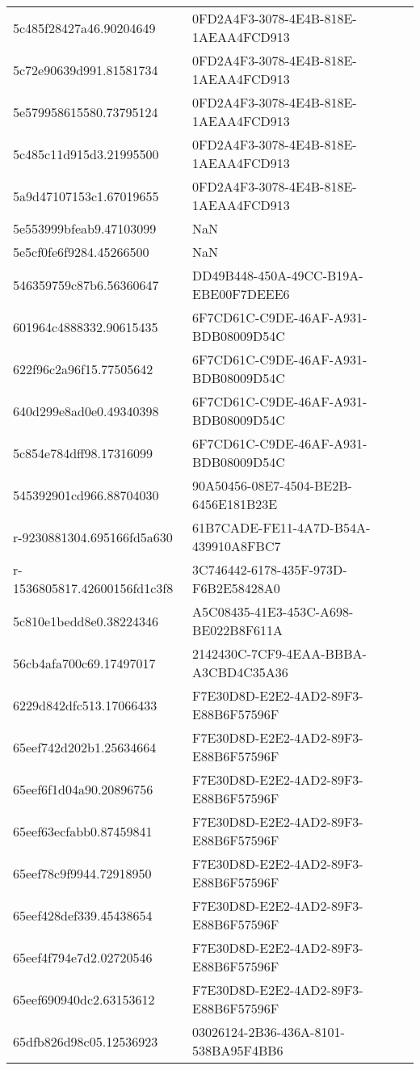 \begin{tabular}{ll}
5c485f28427a46.90204649 & 0FD2A4F3-3078-4E4B-818E-1AEAA4FCD913 \\
5c72e90639d991.81581734 & 0FD2A4F3-3078-4E4B-818E-1AEAA4FCD913 \\
5e579958615580.73795124 & 0FD2A4F3-3078-4E4B-818E-1AEAA4FCD913 \\
5c485c11d915d3.21995500 & 0FD2A4F3-3078-4E4B-818E-1AEAA4FCD913 \\
5a9d47107153c1.67019655 & 0FD2A4F3-3078-4E4B-818E-1AEAA4FCD913 \\
5e553999bfeab9.47103099 & NaN \\
5e5cf0fe6f9284.45266500 & NaN \\
546359759c87b6.56360647 & DD49B448-450A-49CC-B19A-EBE00F7DEEE6 \\
601964c4888332.90615435 & 6F7CD61C-C9DE-46AF-A931-BDB08009D54C \\
622f96c2a96f15.77505642 & 6F7CD61C-C9DE-46AF-A931-BDB08009D54C \\
640d299e8ad0e0.49340398 & 6F7CD61C-C9DE-46AF-A931-BDB08009D54C \\
5c854e784dff98.17316099 & 6F7CD61C-C9DE-46AF-A931-BDB08009D54C \\
545392901cd966.88704030 & 90A50456-08E7-4504-BE2B-6456E181B23E \\
r-9230881304.695166fd5a630 & 61B7CADE-FE11-4A7D-B54A-439910A8FBC7 \\
r-1536805817.42600156fd1c3f8 & 3C746442-6178-435F-973D-F6B2E58428A0 \\
5c810e1bedd8e0.38224346 & A5C08435-41E3-453C-A698-BE022B8F611A \\
56cb4afa700c69.17497017 & 2142430C-7CF9-4EAA-BBBA-A3CBD4C35A36 \\
6229d842dfc513.17066433 & F7E30D8D-E2E2-4AD2-89F3-E88B6F57596F \\
65eef742d202b1.25634664 & F7E30D8D-E2E2-4AD2-89F3-E88B6F57596F \\
65eef6f1d04a90.20896756 & F7E30D8D-E2E2-4AD2-89F3-E88B6F57596F \\
65eef63ecfabb0.87459841 & F7E30D8D-E2E2-4AD2-89F3-E88B6F57596F \\
65eef78c9f9944.72918950 & F7E30D8D-E2E2-4AD2-89F3-E88B6F57596F \\
65eef428def339.45438654 & F7E30D8D-E2E2-4AD2-89F3-E88B6F57596F \\
65eef4f794e7d2.02720546 & F7E30D8D-E2E2-4AD2-89F3-E88B6F57596F \\
65eef690940dc2.63153612 & F7E30D8D-E2E2-4AD2-89F3-E88B6F57596F \\
65dfb826d98c05.12536923 & 03026124-2B36-436A-8101-538BA95F4BB6 \\

\end{tabular}
